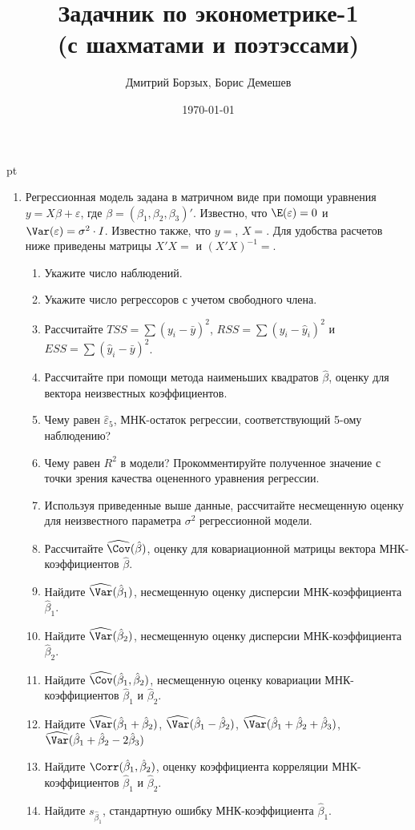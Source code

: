 \documentclass[pdftex,12pt,a4paper]{article}
\title{Задачник по эконометрике-1 \\ {\small (с шахматами и поэтэссами)}}
\author{Дмитрий Борзых, Борис Демешев}
\date{\today}
\def \hb{\hat{\beta}}
\def \he{\hat{\varepsilon}}
\begin{document}
\maketitle %


 pt %



\begin{enumerate}
\item Регрессионная модель   задана в матричном виде при помощи уравнения $y=X\beta+\varepsilon$, где $\beta=(\beta_1,\beta_2,\beta_3)'$.
Известно, что $\E(\varepsilon)=0$  и  $\Var(\varepsilon)=\sigma^2\cdot I$.
Известно также, что $y=$, $X=$.
Для удобства расчетов ниже приведены матрицы 
 $X'X=$ и $(X'X)^{-1}=$.

\begin{enumerate}
\item Укажите число наблюдений.
\item Укажите число регрессоров с учетом свободного члена.
\item Рассчитайте $TSS=\sum (y_i-\bar{y})^2$, $RSS=\sum (y_i-\hat{y}_i)^2$ и $ESS=\sum (\hat{y}_i-\bar{y})^2$.
\item Рассчитайте при помощи метода наименьших квадратов $\hb$, оценку для вектора неизвестных коэффициентов.
\item Чему равен $\he_5$, МНК-остаток регрессии, соответствующий 5-ому наблюдению?
\item Чему равен $R^2$  в модели? Прокомментируйте полученное значение с точки зрения качества оцененного уравнения регрессии.
\item Используя приведенные выше данные, рассчитайте несмещенную оценку для неизвестного параметра $\sigma^2$ регрессионной модели.
\item Рассчитайте $\widehat{\Cov}(\hb)$, оценку для ковариационной матрицы вектора МНК-коэффициентов $\hb$.  
\item Найдите $\widehat{\Var}(\hb_1)$, несмещенную оценку дисперсии МНК-коэффициента $\hb_1$.
\item Найдите $\widehat{\Var}(\hb_2)$, несмещенную оценку дисперсии МНК-коэффициента $\hb_2$.
\item Найдите $\widehat{\Cov}(\hb_1,\hb_2)$, несмещенную оценку ковариации МНК-коэффициентов $\hb_1$ и $\hb_2$.
\item Найдите $\widehat{\Var}(\hb_1+\hb_2)$, $\widehat{\Var}(\hb_1-\hb_2)$, $\widehat{\Var}(\hb_1+\hb_2+\hb_3)$, $\widehat{\Var}(\hb_1+\hb_2-2\hb_3)$
\item Найдите $\Corr(\hb_1,\hb_2)$, оценку коэффициента корреляции МНК-коэффициентов $\hb_1$ и $\hb_2$.
\item Найдите $s_{\hb_1}$, стандартную ошибку МНК-коэффициента $\hb_1$.
\end{enumerate}


\end{enumerate}
\end{document}
